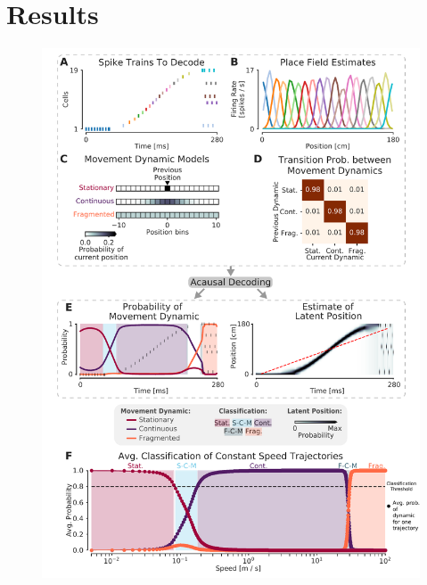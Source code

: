 \documentclass[9pt,lineno]{elife}
\begin{document}
\section*{Results}

\begin{figure}
\includegraphics[width=0.65\linewidth]{figures/Figure1/Figure1_final}

\end{figure}
\end{document}
